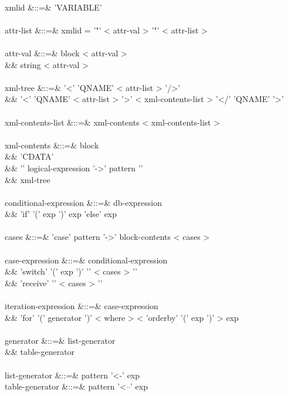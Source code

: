 \documentclass[11pt,a4paper]{article}
\begin{document}
\begin{grammar}
\\
xmlid &::=& 'VARIABLE' \\
\\
attr-list &::=& xmlid = '"' < attr-val > '"' < attr-list >  \\
\\
attr-val &::=& block < attr-val > \\
&&             string < attr-val >  \\
\\
xml-tree &::=& '<' 'QNAME' < attr-list > '/>' \\
&&             '<' 'QNAME' < attr-list > '>' < xml-contents-list > '</' 'QNAME' '>' \\
\\
xml-contents-list &::=& xml-contents < xml-contents-list > \\
\\
xml-contents &::=& block \\
&&                 'CDATA' \\
&&                 '{' logical-expression '->' pattern '}' \\
&&                 xml-tree \\
\\
conditional-expression &::=& db-expression \\
&&                           'if' '(' exp ')' exp 'else' exp \\
\\
cases &::=& 'case' pattern '->' block-contents < cases >  \\
\\
case-expression &::=&  conditional-expression \\
&&                     'switch' '(' exp ')' '{' < cases > '}' \\
&&                     'receive' '{' < cases > '}' \\
\\
iteration-expression &::=& case-expression \\
&&                         'for' '(' generator ')' < where > < 'orderby' '(' exp ')' > exp \\
\\
generator &::=&  list-generator \\
&&               table-generator \\
\\
list-generator  &::=&  pattern '<-' exp \\
table-generator &::=& pattern '<--' exp \\
\\

\end{grammar}
\end{document}
